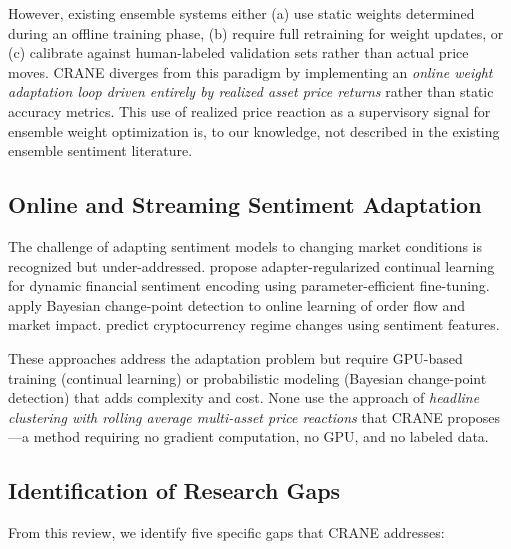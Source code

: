 However, existing ensemble systems either (a) use static weights determined during an offline training phase, (b) require full retraining for weight updates, or (c) calibrate against human-labeled validation sets rather than actual price moves. CRANE diverges from this paradigm by implementing an \emph{online weight adaptation loop driven entirely by realized asset price returns} rather than static accuracy metrics. This use of realized price reaction as a supervisory signal for ensemble weight optimization is, to our knowledge, not described in the existing ensemble sentiment literature.

\subsection{Online and Streaming Sentiment Adaptation}

The challenge of adapting sentiment models to changing market conditions is recognized but under-addressed. \citet{song2025adapter} propose adapter-regularized continual learning for dynamic financial sentiment encoding using parameter-efficient fine-tuning. \citet{tsaknaki2023online} apply Bayesian change-point detection to online learning of order flow and market impact. \citet{parra2023sentiment} predict cryptocurrency regime changes using sentiment features.

These approaches address the adaptation problem but require GPU-based training (continual learning) or probabilistic modeling (Bayesian change-point detection) that adds complexity and cost. None use the approach of \emph{headline clustering with rolling average multi-asset price reactions} that CRANE proposes---a method requiring no gradient computation, no GPU, and no labeled data.

\subsection{Identification of Research Gaps}
\label{sec:gaps}

From this review, we identify five specific gaps that CRANE addresses:

